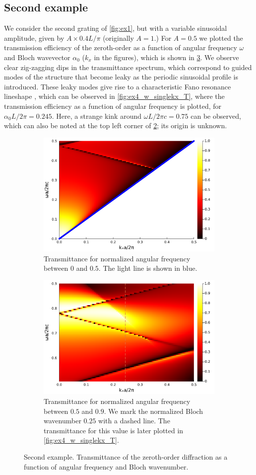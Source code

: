 \documentclass[reprint,amsmath,amssymb,
 aps]{revtex4-2}
\begin{document}
\subsection{Second example}
We consider the second grating of \cref{fig:ex1}, but with a variable sinusoidal amplitude, given by $A\times 0.4L/\pi$ (originally $A=1$.) For $A=0.5$ we plotted the transmission efficiency of the zeroth-order as a function of angular frequency $\omega$ and Bloch wavevector $\alpha_0$ ($k_x$ in the figures), which is shown in \cref{fig:ex4_w_kx_T}. We observe clear zig-zagging dips in the transmittance spectrum, which correspond to guided modes of the structure that become leaky as the periodic sinusoidal profile is introduced. These leaky modes give rise to a characteristic Fano resonance lineshape \cite{fan2003temporal}, which can be observed in \cref{fig:ex4_w_singlekx_T}, where the transmission efficiency as a function of angular frequency is plotted, for $\alpha_0 L / 2\pi = 0.245$. Here, a strange kink around $\omega L / 2\pi c = 0.75$ can be observed, which can also be noted at the top left corner of \cref{fig:ex4_w_kx_T_v1}; its origin is unknown.

\begin{figure}[h!]
\begin{subfigure}{.5\textwidth}
\includegraphics[width=0.6\columnwidth]{figures/ex4_w_kx_T_v2.pdf}
  \caption{Transmittance for normalized angular frequency between $0$ and $0.5$. The light line is shown in blue.}
\label{fig:ex4_w_kx_T_v2}
\end{subfigure}
\begin{subfigure}{.5\textwidth}
\includegraphics[width=0.6\columnwidth]{figures/ex4_w_kx_T_v1.pdf}
  \caption{Transmittance for normalized angular frequency between $0.5$ and $0.9$. We mark the normalized Bloch wavenumber $0.25$ with a dashed line. The transmittance for this value is later plotted in \cref{fig:ex4_w_singlekx_T}.}
\label{fig:ex4_w_kx_T_v1}
\end{subfigure}
\caption{Second example. Transmittance of the zeroth-order diffraction as a function of angular frequency and Bloch wavenumber.}
\label{fig:ex4_w_kx_T}
\end{figure}
\end{document}

